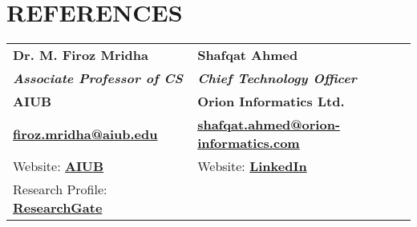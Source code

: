\documentclass[]{deedy-resume-openfont}
\begin{document}
\begin{minipage}[t]{0.66\textwidth}

	\section{REFERENCES}

	\begin{tabularx}{\textwidth}{p{}|p{}}
		\textbf{Dr. M. Firoz Mridha}                                                           & \textbf{Shafqat Ahmed}                                                                            \\
		\textit{\textbf{Associate Professor of CS}}                                            & \textit{\textbf{Chief Technology Officer}}                                                        \\
		\textbf{AIUB}                                                                          & \textbf{Orion Informatics Ltd.}                                                                   \\
		\href{mailto:firoz.mridha@aiub.edu}{\bf firoz.mridha@aiub.edu}                         & \href{mailto:shafqat.ahmed@orion-informatics.com}{\bf \mbox{shafqat.ahmed@orion-informatics.com}} \\
		Website: \href{https://cs.aiub.edu/profile/firoz.mridha}{\bf AIUB}                     & Website: \href{https://www.linkedin.com/in/shafqatahmed/}{\bf LinkedIn}                           \\
		Research Profile: \href{https://www.researchgate.net/profile/M-Ph-D}{\bf ResearchGate} &                                                                                                   \\
	\end{tabularx}





\end{minipage}%
\hfill
\end{document}
